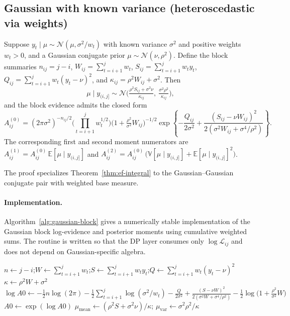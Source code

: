 \subsection{Gaussian with known variance (heteroscedastic via weights)}
\label{sec:family-gaussian}

\begin{proposition}
\label{prop:gaussian-block}
Suppose $y_t\mid \mu \sim \mathcal{N}(\mu,\sigma^2/w_t)$ with known variance $\sigma^2$ and
positive weights $w_t>0$, and a Gaussian conjugate prior $\mu\sim\mathcal{N}(\nu,\rho^2)$. Define
the block summaries
$n_{ij}=j-i$, $W_{ij}=\sum_{t=i+1}^j w_t$, $S_{ij}=\sum_{t=i+1}^j w_t y_t$,
$Q_{ij}=\sum_{t=i+1}^j w_t (y_t-\nu)^2$, and $\kappa_{ij}=\rho^2 W_{ij}+\sigma^2$.
Then
\[
\mu\mid y_{(i,j]} \sim \mathcal{N}\!\Big(
\tfrac{\rho^2 S_{ij} + \sigma^2 \nu}{\kappa_{ij}},
\ \tfrac{\sigma^2\rho^2}{\kappa_{ij}}
\Big),
\]
and the block evidence admits the closed form
\[
A^{(0)}_{ij}
=(2\pi\sigma^2)^{-n_{ij}/2}
\Big(\prod_{t=i+1}^j w_t^{1/2}\Big)
\Big(1+\tfrac{\rho^2}{\sigma^2}W_{ij}\Big)^{-1/2}
\exp\!\left\{-\frac{Q_{ij}}{2\sigma^2}
+\frac{(S_{ij}-\nu W_{ij})^2}{2(\sigma^2 W_{ij}+\sigma^4/\rho^2)}\right\}.
\]
The corresponding first and second moment numerators are
$A^{(1)}_{ij}=A^{(0)}_{ij}\,\mathbb{E}[\mu\mid y_{(i,j]}]$ and
$A^{(2)}_{ij}=A^{(0)}_{ij}\,\big(\mathbb{V}[\mu\mid y_{(i,j]}]+\mathbb{E}[\mu\mid y_{(i,j]}]^2\big)$.
\end{proposition}

The proof specializes Theorem~\ref{thm:ef-integral} to the Gaussian--Gaussian conjugate pair with weighted base measure.

\paragraph{Implementation.}
Algorithm~\ref{alg:gaussian-block} gives a numerically stable implementation of the Gaussian block log-evidence and posterior moments using cumulative weighted sums.
The routine is written so that the DP layer consumes only $\log \mathcal{L}_{ij}$ and does not depend on Gaussian-specific algebra.

\begin{algorithm}[H]
\caption{GaussianBlock$(y,w,i,j,\nu,\rho^2,\sigma^2)$}
\label{alg:gaussian-block}
\KwIn{Block indices $(i,j]$; observations $y_{i+1:j}$; weights $w_{i+1:j}$}
$n\leftarrow j-i$;\quad $W\leftarrow \sum_{t=i+1}^j w_t$;\quad $S\leftarrow \sum_{t=i+1}^j w_t y_t$;\quad $Q\leftarrow \sum_{t=i+1}^j w_t (y_t-\nu)^2$\;
$\kappa \leftarrow \rho^2 W+\sigma^2$\;
$\log A0 \leftarrow -\tfrac{1}{2}n\log(2\pi)
-\tfrac{1}{2}\sum_{t=i+1}^j \log(\sigma^2/w_t)
-\tfrac{Q}{2\sigma^2}
+\tfrac{(S-\nu W)^2}{2(\sigma^2 W+\sigma^4/\rho^2)}
-\tfrac{1}{2}\log\big(1+\tfrac{\rho^2}{\sigma^2}W\big)$\;
$A0\leftarrow \exp(\log A0)$\;
$\mu_{\text{mean}}\leftarrow (\rho^2 S+\sigma^2\nu)/\kappa$;\quad
$\mu_{\text{var}}\leftarrow \sigma^2\rho^2/\kappa$\;
\end{algorithm}

